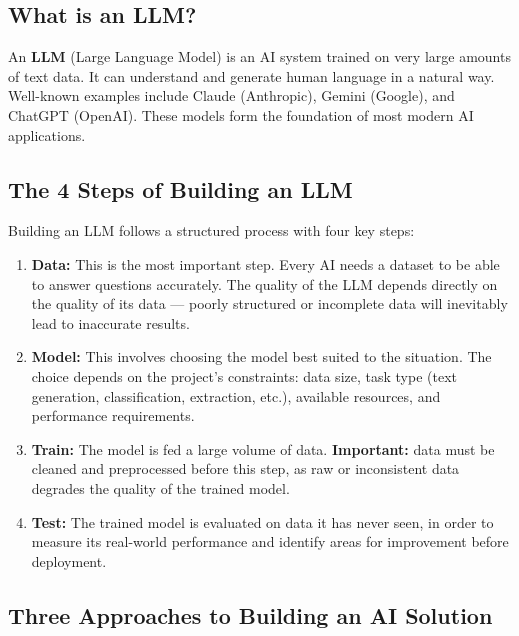 \documentclass[12pt, a4paper]{article}
\begin{document}
\subsection{What is an LLM?}

An \textbf{LLM} (Large Language Model) is an AI system trained on very large amounts of text data. It can understand and generate human language in a natural way. Well-known examples include Claude (Anthropic), Gemini (Google), and ChatGPT (OpenAI). These models form the foundation of most modern AI applications.

\subsection{The 4 Steps of Building an LLM}

Building an LLM follows a structured process with four key steps:

\begin{enumerate}
  \item \textbf{Data:} This is the most important step. Every AI needs a dataset to be able to answer questions accurately. The quality of the LLM depends directly on the quality of its data --- poorly structured or incomplete data will inevitably lead to inaccurate results.

  \item \textbf{Model:} This involves choosing the model best suited to the situation. The choice depends on the project's constraints: data size, task type (text generation, classification, extraction, etc.), available resources, and performance requirements.

  \item \textbf{Train:} The model is fed a large volume of data. \textbf{Important:} data must be cleaned and preprocessed before this step, as raw or inconsistent data degrades the quality of the trained model.

  \item \textbf{Test:} The trained model is evaluated on data it has never seen, in order to measure its real-world performance and identify areas for improvement before deployment.
\end{enumerate}

\subsection{Three Approaches to Building an AI Solution}
\end{document}
